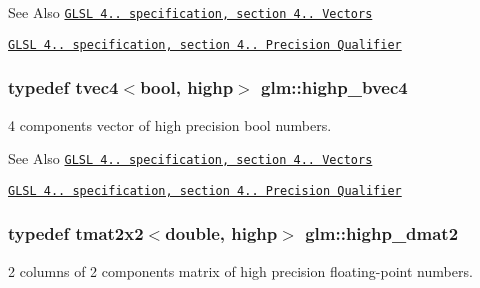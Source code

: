 \begin{DoxySeeAlso}{See Also}
\href{http://www.opengl.org/registry/doc/GLSLangSpec.4.20.8.pdf}{\tt G\-L\-S\-L 4.. specification, section 4.. Vectors} 

\href{http://www.opengl.org/registry/doc/GLSLangSpec.4.20.8.pdf}{\tt G\-L\-S\-L 4.. specification, section 4.. Precision Qualifier} 
\end{DoxySeeAlso}
\hypertarget{group__core__precision_ga12155cf93fb8fea5d9c4c7e2d72aed4e}{
\subsubsection[{highp\-\_\-bvec4}]{\setlength{\rightskip}{0pt plus 5cm}typedef tvec4$<$bool, highp$>$ {\bf glm\-::highp\-\_\-bvec4}}}\label{group__core__precision_ga12155cf93fb8fea5d9c4c7e2d72aed4e}
4 components vector of high precision bool numbers.

\begin{DoxySeeAlso}{See Also}
\href{http://www.opengl.org/registry/doc/GLSLangSpec.4.20.8.pdf}{\tt G\-L\-S\-L 4.. specification, section 4.. Vectors} 

\href{http://www.opengl.org/registry/doc/GLSLangSpec.4.20.8.pdf}{\tt G\-L\-S\-L 4.. specification, section 4.. Precision Qualifier} 
\end{DoxySeeAlso}
\hypertarget{group__core__precision_ga08cc902dad76205cd28a80bf695814a7}{
\subsubsection[{highp\-\_\-dmat2}]{\setlength{\rightskip}{0pt plus 5cm}typedef tmat2x2$<$double, highp$>$ {\bf glm\-::highp\-\_\-dmat2}}}\label{group__core__precision_ga08cc902dad76205cd28a80bf695814a7}
2 columns of 2 components matrix of high precision floating-\/point numbers.

